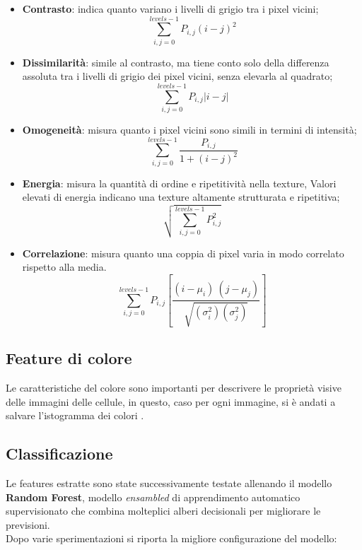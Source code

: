 \documentclass[italian,10pt,a4paper]{article}
\begin{document}
					\begin{itemize}
						
						\item \textbf{Contrasto}: indica quanto variano i livelli di grigio tra i pixel vicini; $$\sum_{i,j=0}^{levels-1} P_{i,j}(i-j)^2$$
						
						\item \textbf{Dissimilarità}: simile al contrasto, ma tiene conto solo della differenza assoluta tra i livelli di grigio dei pixel vicini, senza elevarla al quadrato; $$\sum_{i,j=0}^{levels-1}P_{i,j}|i-j|$$
						
						\item \textbf{Omogeneità}: misura quanto i pixel vicini sono simili in termini di intensità; $$\sum_{i,j=0}^{levels-1}\frac{P_{i,j}}{1+(i-j)^2}$$
						
						\item \textbf{Energia}: misura la quantità di ordine e ripetitività nella texture, Valori elevati di energia indicano una texture altamente strutturata e ripetitiva; $$\sqrt{\sum_{i,j=0}^{levels-1} P_{i,j}^2}$$
						
						\item \textbf{Correlazione}: misura quanto una coppia di pixel varia in modo correlato rispetto alla media. $$\sum_{i,j=0}^{levels-1} P_{i,j}\left[\frac{(i-\mu_i) \
							(j-\mu_j)}{\sqrt{(\sigma_i^2)(\sigma_j^2)}}\right]$$
						
					\end{itemize}
					
				\subsection{Feature di colore}
					Le caratteristiche del colore sono importanti per descrivere le proprietà visive delle immagini delle cellule, in questo, caso per ogni immagine, si è andati a salvare l'istogramma dei colori \cite{Baker_2021}.
				 			
		\subsection{Classificazione}
		
			Le features estratte sono state successivamente testate allenando il modello \textbf{Random Forest}, modello \textit{ensambled} di apprendimento automatico supervisionato che combina molteplici alberi decisionali per migliorare le previsioni. \\
			\linebreak
			Dopo varie sperimentazioni si riporta la migliore configurazione del modello:
			
\end{document}
